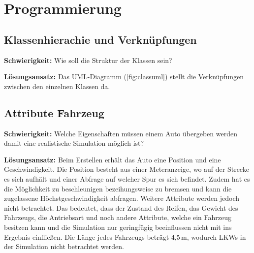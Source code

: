 \chapter{Programmierung}

\section{Klassenhierachie und Verknüpfungen}
\textbf{Schwierigkeit:} Wie soll die Struktur der Klassen sein?
\begin{addmargin}[25pt]{0pt}
	\item \textbf{Lösungsansatz:} Das UML-Diagramm (\ref{fig:classuml}) stellt die Verknüpfungen zwischen den einzelnen Klassen da.
\end{addmargin}

\section{Attribute Fahrzeug}
\textbf{Schwierigkeit:} Welche Eigenschaften müssen einem Auto übergeben werden damit eine realistische Simulation möglich ist?
\begin{addmargin}[25pt]{0pt}
	\item \textbf{Lösungsansatz:} Beim Erstellen erhält das Auto eine Position und eine Geschwindigkeit. Die Position besteht aus einer Meteranzeige, wo auf der Strecke es sich aufhält und einer Abfrage auf welcher Spur es sich befindet. Zudem hat es die Möglichkeit zu beschleunigen bezeihungsweise zu bremsen und kann die zugelassene Höchstgeschwindigkeit abfragen. Weitere Attribute werden jedoch nicht betrachtet. Das bedeutet, dass der Zustand des Reifen, das Gewicht des Fahrzeugs, die Antriebsart und noch andere Attribute, welche ein Fahrzeug besitzen kann und die Simulation nur geringfügig beeinflussen nicht mit ins Ergebnis einfließen. Die Länge jedes Fahrzeugs beträgt 4,5\,m, wodurch LKWs in der Simulation nicht betrachtet werden. \\
\end{addmargin}

